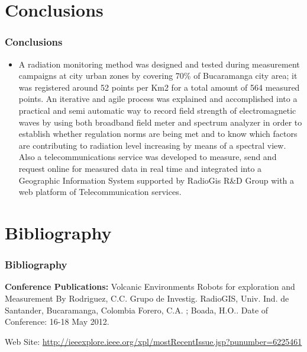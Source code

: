 \documentclass[xcolor=svgnames]{beamer}
\begin{document}
\section{Conclusions}
\begin{frame}
\frametitle{Conclusions}
\begin{itemize}
 \item A radiation monitoring method was designed and tested during measurement campaigns at city urban zones by covering 70\% of Bucaramanga city area; it was registered around 52 points per Km2 for a total amount of 564 measured points. An iterative and agile process was explained and accomplished into a practical and semi automatic way to record field strength of electromagnetic waves by using both broadband field meter and spectrum analyzer in order to establish whether regulation norms are being met and to know which factors are contributing to radiation level increasing by means of a spectral view. Also a telecommunications service was developed to measure, send and request online for measured data in real time and integrated into a Geographic Information System supported by RadioGis R\&D Group with a web platform of Telecommunication services.
\end{itemize}
\end{frame}

\section{Bibliography}
\begin{frame}
\frametitle{Bibliography}
\begin{thebibliography}{10}

 \textbf{Conference Publications:} Volcanic Environments Robots for exploration and Measurement By  Rodriguez, C.C. Grupo de Investig. RadioGIS, Univ. Ind. de Santander, Bucaramanga, Colombia Forero, C.A. ;  Boada, H.O.. Date of Conference: 16-18 May 2012.

 Web Site: \url{http://ieeexplore.ieee.org/xpl/mostRecentIssue.jsp?punumber=6225461}

\end{thebibliography}
\end{frame}
\end{document}
